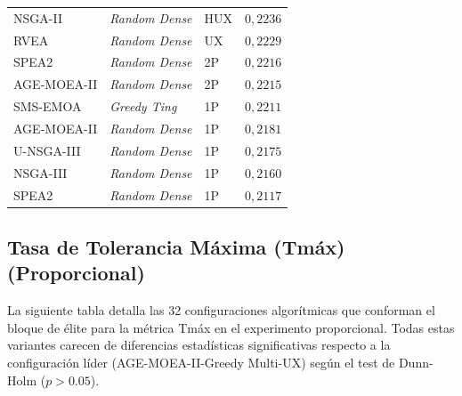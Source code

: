 \begin{longtable}{lllc}
NSGA-II & \textit{Random Dense} & HUX & $0{,}2236$ \\
RVEA & \textit{Random Dense} & UX & $0{,}2229$ \\
SPEA2 & \textit{Random Dense} & 2P & $0{,}2216$ \\
AGE-MOEA-II & \textit{Random Dense} & 2P & $0{,}2215$ \\
SMS-EMOA & \textit{Greedy Ting} & 1P & $0{,}2211$ \\
AGE-MOEA-II & \textit{Random Dense} & 1P & $0{,}2181$ \\
U-NSGA-III & \textit{Random Dense} & 1P & $0{,}2175$ \\
NSGA-III & \textit{Random Dense} & 1P & $0{,}2160$ \\
SPEA2 & \textit{Random Dense} & 1P & $0{,}2117$ \\
\end{longtable}

\subsection{Tasa de Tolerancia Máxima (Tmáx) (Proporcional)}\label{anexo:elite_maxt_prop}

La siguiente tabla detalla las 32 configuraciones algorítmicas que conforman el bloque de élite para la métrica Tmáx en el experimento proporcional. Todas estas variantes carecen de diferencias estadísticas significativas respecto a la configuración líder (AGE-MOEA-II-Greedy Multi-UX) según el test de Dunn-Holm ($p > 0.05$).

